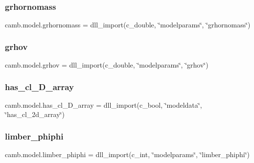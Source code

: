 \subsubsection{\texorpdfstring{grhornomass}{grhornomass}}
{\footnotesize\ttfamily camb.\+model.\+grhornomass = dll\+\_\+import(c\+\_\+double, \char`\"{}modelparams\char`\"{}, \char`\"{}grhornomass\char`\"{})}

\mbox{\label{namespacecamb_1_1model_ac1951d53b75d4a09c54a90ae7a33c1dc}} 
\subsubsection{\texorpdfstring{grhov}{grhov}}
{\footnotesize\ttfamily camb.\+model.\+grhov = dll\+\_\+import(c\+\_\+double, \char`\"{}modelparams\char`\"{}, \char`\"{}grhov\char`\"{})}

\mbox{\label{namespacecamb_1_1model_a7580d958d18c9a8a4e9a6a3356efe4c1}} 
\subsubsection{\texorpdfstring{has\+\_\+cl\+\_\+D\+\_\+array}{has\_cl\_2D\_array}}
{\footnotesize\ttfamily camb.\+model.\+has\+\_\+cl\+\_\+D\+\_\+array = dll\+\_\+import(c\+\_\+bool, \char`\"{}modeldata\char`\"{}, \char`\"{}has\+\_\+cl\+\_\+2d\+\_\+array\char`\"{})}

\mbox{\label{namespacecamb_1_1model_aaff94e9b95fd6be5946fdfc0740db9d4}} 
\subsubsection{\texorpdfstring{limber\+\_\+phiphi}{limber\_phiphi}}
{\footnotesize\ttfamily camb.\+model.\+limber\+\_\+phiphi = dll\+\_\+import(c\+\_\+int, \char`\"{}modelparams\char`\"{}, \char`\"{}limber\+\_\+phiphi\char`\"{})}

